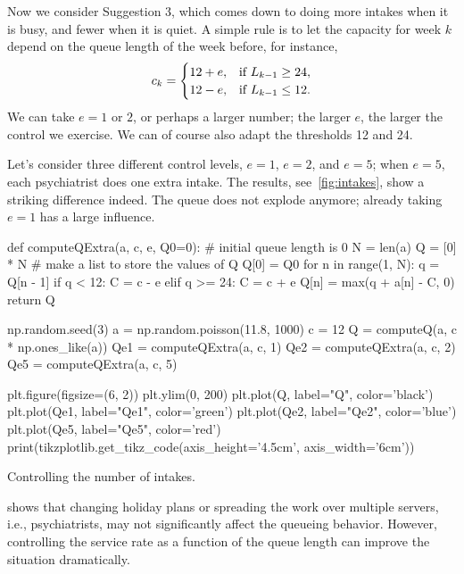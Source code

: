 Now we consider Suggestion 3, which comes down to doing more intakes when it is busy, and fewer when it is quiet.
A simple rule is to let the capacity  for week $k$ depend on the queue length of the week before, for instance,
\begin{equation}\label{eq:103}
  c_k = 
  \begin{cases}
    12 + e, & \text{if } L_{k-1} \geq 24, \\
    12 - e, & \text{if } L_{k-1} \leq 12.
  \end{cases}
\end{equation}
We can take  $e=1$ or $2$, or perhaps a larger number; the larger $e$, the larger the control we exercise. We can of course also adapt the thresholds 12 and 24.

Let's consider three different control levels, $e=1$, $e=2$, and $e=5$; when $e=5$, each psychiatrist does one extra intake.
The results, see~\cref{fig:intakes}, show a striking difference indeed.
The queue does not explode anymore;  already taking $e=1$ has a large influence.

\begin{marginfigure}
\begin{pycode}[simulation]
def computeQExtra(a, c, e, Q0=0):  #  initial queue length is 0
    N = len(a)
    Q = [0] * N  # make a list to store the values of  Q
    Q[0] = Q0
    for n in range(1, N):
        q = Q[n - 1]
        if q < 12:
            C = c - e
        elif q >= 24:
            C = c + e
        Q[n] = max(q + a[n] - C, 0)
    return Q


np.random.seed(3)
a = np.random.poisson(11.8, 1000)
c = 12
Q = computeQ(a, c * np.ones_like(a))
Qe1 = computeQExtra(a, c, 1)
Qe2 = computeQExtra(a, c, 2)
Qe5 = computeQExtra(a, c, 5)

plt.figure(figsize=(6, 2))
plt.ylim(0, 200)
plt.plot(Q, label="Q", color='black')
plt.plot(Qe1, label="Qe1", color='green')
plt.plot(Qe2, label="Qe2", color='blue')
plt.plot(Qe5, label="Qe5", color='red')
print(tikzplotlib.get_tikz_code(axis_height='4.5cm', axis_width='6cm'))
\end{pycode}
\caption{Controlling the number of intakes. }
\label{fig:intakes}
\end{marginfigure}


 shows that changing holiday plans or spreading the work over multiple servers, i.e., psychiatrists, may not significantly affect the queueing behavior.
However, controlling the service rate as a function of the queue length can improve the situation dramatically.


